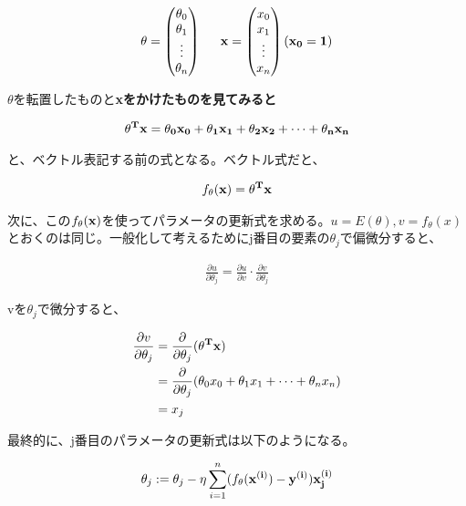 \documentclass{jsarticle}
\begin{document}
\begin{align}
  	\bf{\theta} = \begin{pmatrix} 
      \theta_0\\
      \theta_1\\
      \vdots\\
      \theta_n
	\end{pmatrix}
    \hspace{15pt}
    \bf{x} = \begin{pmatrix} 
      x_0\\
      x_1\\
      \vdots\\
      x_n
	\end{pmatrix}
    (x_0 = 1)
\end{align}	

$\theta$を転置したものと\bf{x}をかけたものを見てみると

\begin{align}
	\bf{\theta^{T}}\bf{x} = \theta_0 x_0 + \theta_1 x_1 + \theta_2 x_2 + \cdots + \theta_n x_n 
\end{align}

と、ベクトル表記する前の式となる。ベクトル式だと、

\begin{align}
	f_{\theta}(\bf{x}) = \bf{\theta^{T}}\bf{x}
\end{align}

次に、この$f_{\theta}(\bf{x})$を使ってパラメータの更新式を求める。$u = E(\theta), v = f_{\theta}(x)$とおくのは同じ。一般化して考えるためにj番目の要素の$\theta_j$で偏微分すると、

\begin{align}
	\frac{\partial u}{\partial \theta_j} = \frac{\partial u}{\partial v} \cdot \frac{\partial v}{\partial \theta_j}
\end{align}

vを$\theta_j$で微分すると、

\begin{align}
	\frac{\partial v}{\partial \theta_j} &= \frac{\partial}{\partial \theta_j}(\bf{\theta}^{T}\bf{x})\\
    &= \frac{\partial}{\partial \theta_j} (\theta_0 x_0 + \theta_1 x_1 + \cdots + \theta_n x_n)\\
    &= x_j
\end{align}

最終的に、j番目のパラメータの更新式は以下のようになる。

\begin{align}
	\theta_j := \theta_j - \eta \sum_{i=1}^n (f_{\theta}(\bf{x}^{(i)}) - y^{(i)})x_j^{(i)}
\end{align}
\end{document}
